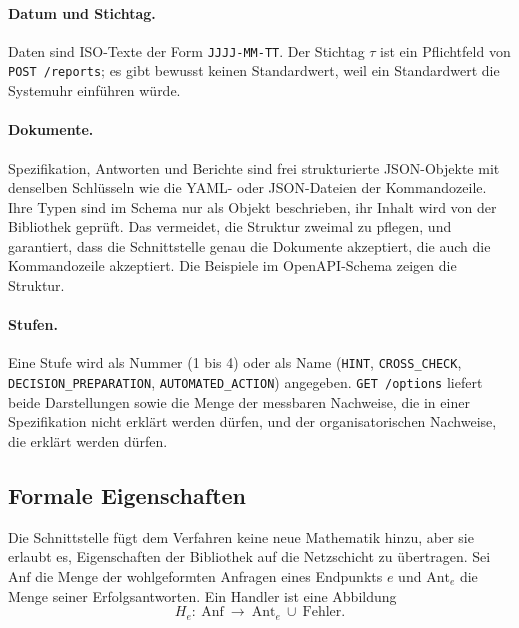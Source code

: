 \documentclass[a4paper,12pt]{article}
\theoremstyle{definition}
\begin{document}
\paragraph{Datum und Stichtag.}
Daten sind ISO-Texte der Form \texttt{JJJJ-MM-TT}. Der Stichtag $\tau$ ist ein Pflichtfeld von \texttt{POST /reports}; es gibt bewusst keinen Standardwert, weil ein Standardwert die Systemuhr einführen würde.

\paragraph{Dokumente.}
Spezifikation, Antworten und Berichte sind frei strukturierte JSON-Objekte mit denselben Schlüsseln wie die YAML- oder JSON-Dateien der Kommandozeile. Ihre Typen sind im Schema nur als Objekt beschrieben, ihr Inhalt wird von der Bibliothek geprüft. Das vermeidet, die Struktur zweimal zu pflegen, und garantiert, dass die Schnittstelle genau die Dokumente akzeptiert, die auch die Kommandozeile akzeptiert. Die Beispiele im OpenAPI-Schema zeigen die Struktur.

\paragraph{Stufen.}
Eine Stufe wird als Nummer (1 bis 4) oder als Name (\texttt{HINT}, \texttt{CROSS\_CHECK}, \texttt{DECISION\_PREPARATION}, \texttt{AUTOMATED\_ACTION}) angegeben. \texttt{GET /options} liefert beide Darstellungen sowie die Menge der messbaren Nachweise, die in einer Spezifikation nicht erklärt werden dürfen, und der organisatorischen Nachweise, die erklärt werden dürfen.

\subsection{Formale Eigenschaften}
\label{sec:api-formal}
Die Schnittstelle fügt dem Verfahren keine neue Mathematik hinzu, aber sie erlaubt es, Eigenschaften der Bibliothek auf die Netzschicht zu übertragen. Sei $\mathrm{Anf}$ die Menge der wohlgeformten Anfragen eines Endpunkts $e$ und $\mathrm{Ant}_e$ die Menge seiner Erfolgsantworten. Ein Handler ist eine Abbildung
\[
H_e:\ \mathrm{Anf}\ \to\ \mathrm{Ant}_e\ \cup\ \mathrm{Fehler}.
\]
\end{document}
